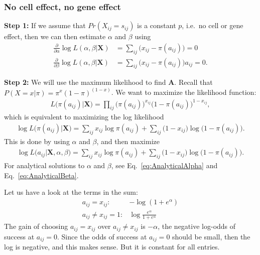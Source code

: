 \documentclass[12pt]{article}
\begin{document}
\subsubsection*{No cell effect, no gene effect} %

{\bf Step 1:} If we assume that $Pr(X_{ij} = s_{ij})$ is a constant $p$, i.e.\ no cell or gene effect, then we can then estimate $\alpha$ and $\beta$ using
\begin{align} \label{eq:AlphaBeta}
  \frac{\partial}{\partial \alpha} \log L(\alpha, \beta|\mathbf{X}) &= \sum_{i j} \big (x_{i j} - \pi(a_{ij}) \big) = 0 \\
  \frac{\partial}{\partial \beta} \log L(\alpha, \beta|\mathbf{X}) &= \sum_{i j} \big (x_{i j} - \pi(a_{ij}) \big )a_{ij} = 0. \nonumber
\end{align}

{\bf Step 2:} We will use the maximum likelihood to find $\mathbf{A}$. 
Recall that $P(X = x|\pi) = \pi^x (1 - \pi)^{(1-x)}$.
We want to maximize the likelihood function:
\begin{align}
  L \big (\pi(a_{ij})|\mathbf{X} \big ) =\prod_{i j}  \big ( \pi(a_{ij}) \big )^{x_{ij}} \big ( 1 - \pi(a_{ij}) \big) ^{1 - x_{ij}},
\end{align}
which is equivalent to maximizing the log likelihood
\begin{align}
  \log L \big (\pi(a_{ij})|\mathbf{X} \big ) =\sum_{i j}x_{ij} \log  \pi(a_{ij})+ \sum_{i j} \big (1 - x_{ij} \big)\log  \big ( 1 - \pi(a_{ij}) \big).
\end{align}
This is done by using $\alpha$ and $\beta$, and then maximize
\begin{align}
  \log L \big (a_{ij}|\mathbf{X}, \alpha, \beta \big ) =\sum_{i j}x_{ij} \log  \pi(a_{ij})+ \sum_{i j} \big (1 - x_{ij} \big)\log  \big ( 1 - \pi(a_{ij}) \big).
\end{align}
For analytical solutions to $\alpha$ and $\beta$, see Eq.~\ref{eq:AnalyticalAlpha} and  Eq.~\ref{eq:AnalyticalBeta}.

Let us have a look at the terms in the sum:
\begin{align}
 a_{ij} = x_{ij}: & -\log(1 + e^{\alpha}) \\
 a_{ij} \neq x_{ij} = 1: &\log \frac{e^{\alpha}}{1 + e^{\alpha}} \nonumber
\end{align}
The gain of choosing $a_{ij} = x_{ij}$ over $ a_{ij} \neq x_{ij}$ is $-\alpha$, the negative log-odds of success at $a_{ij} = 0$.
Since the odds of success at $a_{ij} =0$ should be small, then the log is negative, and this makes sense.
But it is constant for all entries.
\end{document}
